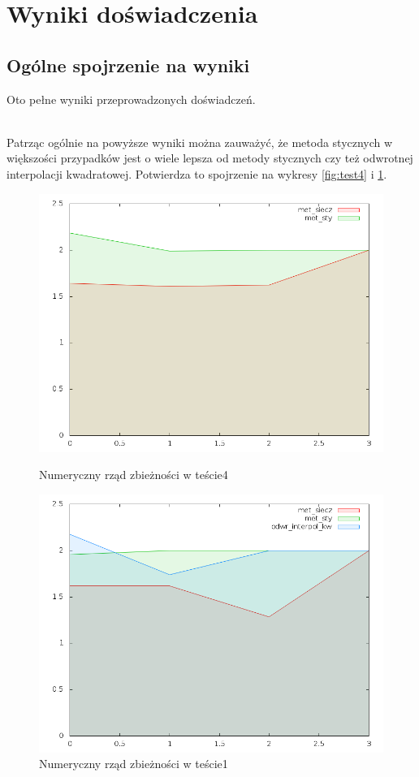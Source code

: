 \documentclass[11pt,wide]{mwart}
\begin{document}
\section{Wyniki doświadczenia}
\subsection{Ogólne spojrzenie na wyniki}
Oto pełne wyniki przeprowadzonych doświadczeń.

\\\indent Patrząc ogólnie na powyższe wyniki można zauważyć, że metoda stycznych w większości przypadków jest o wiele lepsza od metody stycznych czy też odwrotnej interpolacji kwadratowej. Potwierdza to spojrzenie na wykresy \ref{fig:test4} i \ref{fig:test0}.
\begin{figure}[ht]
  \begin{minipage}[b]{0.45\linewidth}
    \centering
    \includegraphics[width=\textwidth]{../wykresy/test4_p.png}
    \caption{Numeryczny rząd zbieżności w teście4}
    \label{fig:test4}
  \end{minipage}
  \hspace{0.5cm}
  \begin{minipage}[b]{0.45\linewidth}
    \centering
    \includegraphics[width=\textwidth]{../wykresy/test1_p.png}
    \caption{Numeryczny rząd zbieżności w teście1}
    \label{fig:test0}
  \end{minipage}
\end{figure}
\end{document}
